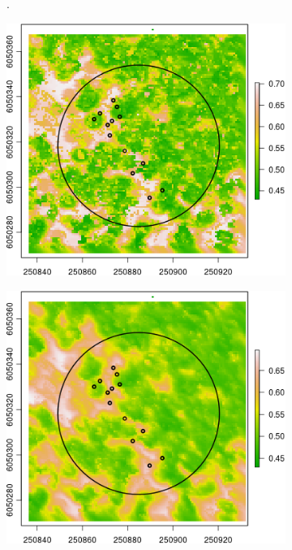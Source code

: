 \documentclass{subfiles}
\begin{document}
\begin{figure} [h!]
\begin{subfigure}[t]{.49\textwidth}
			\caption{.} 
			\label{fig:c1_knn}
		\end{subfigure} \hfill
		\begin{subfigure}[t]{.49\textwidth}
			\centering
			\includegraphics[width=\textwidth]{img/dead/c2_knn_SaltPepper}
			\caption{} 
			\label{fig:c2_SaltPepper}
		\end{subfigure}
		\begin{subfigure}[t]{.49\textwidth}
			\centering
			\includegraphics[width=\textwidth]{img/dead/c3_knn_smoothed}
			\caption{} 
			\label{fig:c3_Smoothed}
		\end{subfigure}
		\caption{ }  
		\label{fig:RF_knn_salt_smooth} 
	\end{figure}
	
\end{document}
